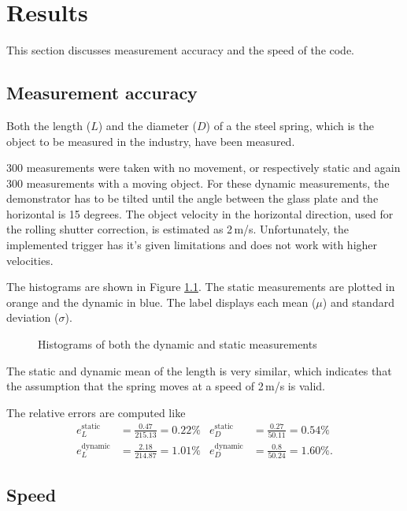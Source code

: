 \chapter{Results}
This section discusses measurement accuracy and the speed of the code.

\section{Measurement accuracy}
Both the length ($L$) and the diameter ($D$) of a the steel spring, which is the object to be measured in the industry, have been measured.

300 measurements were taken with no movement, or respectively static and again 300 measurements with a moving object.
For these dynamic measurements, the demonstrator has to be tilted until the angle between the glass plate and the horizontal is 15 degrees.
The object velocity in the horizontal direction, used for the rolling shutter correction, is estimated as 2\,m/s.
Unfortunately, the implemented trigger has it's given limitations and does not work with higher velocities.

The histograms are shown in Figure \ref{development:hist}.
The static measurements are plotted in orange and the dynamic in blue.
The label displays each mean ($\mu$) and standard deviation ($\sigma$).
\begin{figure}[ht]
	\centering
	\caption{Histograms of both the dynamic and static measurements\label{development:hist}}		
\end{figure}
The static and dynamic mean of the length is very similar, which indicates that the assumption that the spring moves at a speed of 2\,m/s is valid.

The relative errors are computed like
\begin{align*}
	e_{L}^{\text{static}}&=\frac{0.47}{215.13}=0.22\%&e_D^{\text{static}}&=\frac{0.27}{50.11}=0.54\%\\
	e_{L}^{\text{dynamic}}&=\frac{2.18}{214.87}=1.01\%&e_D^{\text{dynamic}}&=\frac{0.8}{50.24}=1.60\%.
\end{align*}


\section{Speed}